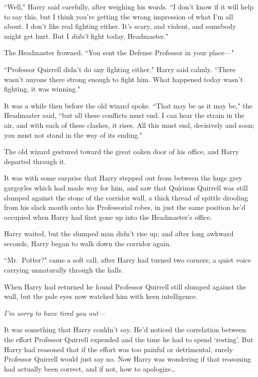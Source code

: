``Well," Harry said carefully, after weighing his words. ``I don't know if it will help to say this, but I think you're getting the wrong impression of what I'm all about. I don't like real fighting either. It's scary, and violent, and somebody might get hurt. But I \emph{didn't} fight today, Headmaster."

The Headmaster frowned. ``You sent the Defense Professor in your place—"

``Professor Quirrell didn't do any fighting either," Harry said calmly. ``There wasn't anyone there strong enough to fight him. What happened today wasn't fighting, it was winning."

It was a while then before the old wizard spoke. ``That may be as it may be," the Headmaster said, ``but all these conflicts must end. I can hear the strain in the air, and with each of these clashes, it rises. All this must end, decisively and soon; you must not stand in the way of its ending."

The old wizard gestured toward the great oaken door of his office, and Harry departed through it.

\later

It was with some surprise that Harry stepped out from between the huge grey gargoyles which had made way for him, and saw that Quirinus Quirrell was still slumped against the stone of the corridor wall, a thick thread of spittle drooling from his slack mouth onto his Professorial robes, in just the same position he'd occupied when Harry had first gone up into the Headmaster's office.

Harry waited, but the slumped man didn't rise up; and after long awkward seconds, Harry began to walk down the corridor again.

``Mr.~Potter?" came a soft call, after Harry had turned two corners; a quiet voice carrying unnaturally through the halls.

When Harry had returned he found Professor Quirrell still slumped against the wall, but the pale eyes now watched him with keen intelligence.

\emph{I'm sorry to have tired you out—}

It was something that Harry couldn't say. He'd noticed the correlation between the effort Professor Quirrell expended and the time he had to spend `resting'. But Harry had reasoned that if the effort was too painful or detrimental, surely Professor Quirrell would just say no. Now Harry was wondering if that reasoning had actually been correct, and if not, how to apologize{\ldots}

